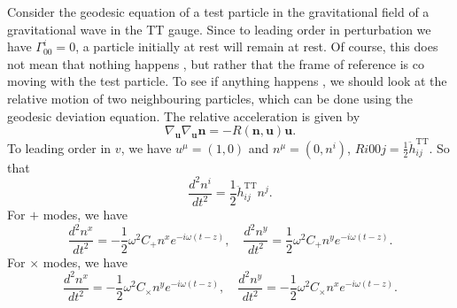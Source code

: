\noindent
Consider the geodesic equation of a test particle in the gravitational field of a gravitational wave in the TT gauge. Since to leading order in perturbation we have $\Gamma^i_{00} = 0$, a particle initially at rest will remain at rest.
Of course, this does not mean that nothing happens , but rather that the frame of reference is co moving with the test particle. To see if anything happens , we should look at the relative motion of two neighbouring particles, which can be done using the geodesic deviation equation. The relative acceleration is given by
\[\nabla_{\bm{u}} \nabla_{\bm{u}} \bm{n} = -R(\bm{n},\bm{u}) \bm{u}.\]
To leading order in $v$, we have $u^{\mu} = (1,0)$ and $n^{\mu} = (0,n^i)$, $R{i00j} = \frac{1}{2}\ddot{h}_{ij}^{\mathrm{TT}}$. So that
\[\frac{d^2n^i}{dt^2} = \frac{1}{2} \ddot{h}_{ij} ^{\mathrm{TT}} n^j.\]
For $+$ modes, we have
\[\frac{d^2n^x}{dt^2} = - \frac{1}{2}\omega^2 C_{+}n^x e^{-i\omega(t-z)}, \quad \frac{d^2n^y}{dt^2} = \frac{1}{2}\omega^2 C_{+}n^y e^{-i\omega(t-z)}.\]
For $\times$ modes, we have
\[\frac{d^2n^x}{dt^2} = - \frac{1}{2}\omega^2 C_{\times}n^y e^{-i\omega(t-z)}, \quad \frac{d^2n^y}{dt^2} = - \frac{1}{2}\omega^2 C_{\times}n^x e^{-i\omega(t-z)}.\]

